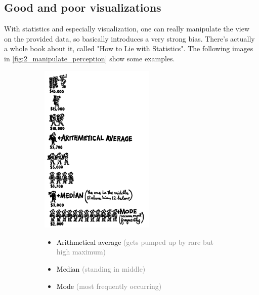 \begin{note}
\subsection*{Good and poor visualizations}
With statistics and especially visualization, one can really manipulate the view on the provided data, so basically introduces a very strong bias. There's actually a whole book about it, called "How to Lie with Statistics". The following images in \ref{fig:2_manipulate_perception} show some examples.

\begin{figure}[h]
  \centering
  \begin{subfigure}{0.45\textwidth}
    \centering
    \includegraphics[width=0.6\textwidth]{assets/visualization_and_extraction/lie/middle.png}
    \begin{itemize}
      \item \textcolor{black}{\small Arithmetical average} \textcolor{gray}{\footnotesize  (gets pumped up by rare but high maximum)}
      \item \textcolor{black}{\small Median} \textcolor{gray}{\footnotesize  (standing in middle)}
      \item \textcolor{black}{\small Mode} \textcolor{gray}{\footnotesize  (most frequently occurring)}
    \end{itemize}
  \end{subfigure}\hspace*{0.05\textwidth}

\end{figure}
\end{note}

